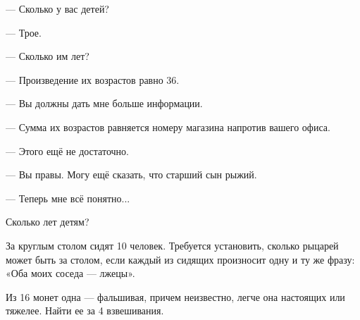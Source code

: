 — Сколько у вас детей?

— Трое.

— Сколько им лет?

— Произведение их возрастов равно 36.

— Вы должны дать мне больше информации.

— Сумма их возрастов равняется номеру магазина напротив вашего офиса.

— Этого ещё не достаточно.

— Вы правы. Могу ещё сказать, что старший сын рыжий.

— Теперь мне всё понятно...

Сколько лет детям?


За круглым столом сидят 10 человек. Требуется установить, сколько рыцарей может быть за столом, если каждый из сидящих произносит одну и ту же фразу: «Оба моих соседа — лжецы».


Из 16 монет одна — фальшивая, причем неизвестно, легче она настоящих или тяжелее. Найти ее за 4 взвешивания.
